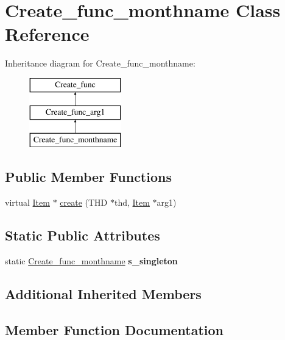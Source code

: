 \hypertarget{classCreate__func__monthname}{}\section{Create\+\_\+func\+\_\+monthname Class Reference}
\label{classCreate__func__monthname}
Inheritance diagram for Create\+\_\+func\+\_\+monthname\+:\begin{figure}[H]
\begin{center}
\leavevmode
\includegraphics[height=3.000000cm]{classCreate__func__monthname}
\end{center}
\end{figure}
\subsection*{Public Member Functions}
\begin{DoxyCompactItemize}
\item 
virtual \mbox{\hyperlink{classItem}{Item}} $\ast$ \mbox{\hyperlink{classCreate__func__monthname_aac138047b0be44a17deb3919096dceff}{create}} (T\+HD $\ast$thd, \mbox{\hyperlink{classItem}{Item}} $\ast$arg1)
\end{DoxyCompactItemize}
\subsection*{Static Public Attributes}
\begin{DoxyCompactItemize}
\item 
\mbox{\label{classCreate__func__monthname_ac11917e3e3929e08b3dd5e1396d5779a}} 
static \mbox{\hyperlink{classCreate__func__monthname}{Create\+\_\+func\+\_\+monthname}} {\bfseries s\+\_\+singleton}
\end{DoxyCompactItemize}
\subsection*{Additional Inherited Members}


\subsection{Member Function Documentation}
\mbox{\label{classCreate__func__monthname_aac138047b0be44a17deb3919096dceff}} 
